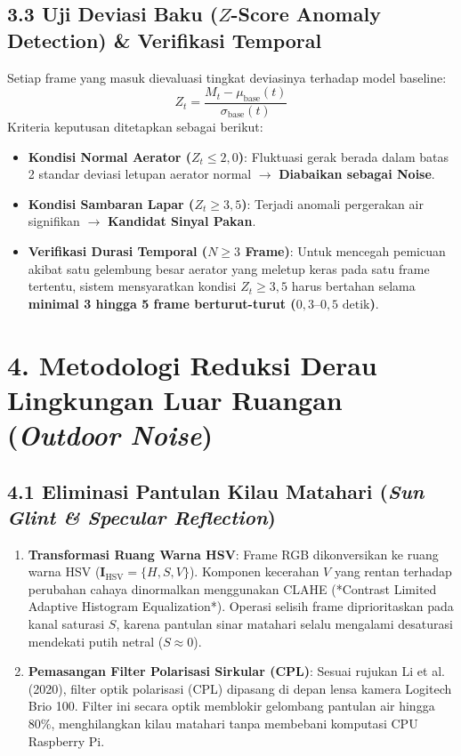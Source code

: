 \documentclass[10pt,a4paper]{article}
\providecommand{\text}[1]{\mbox{#1}}
\begin{document}
\subsection*{3.3 Uji Deviasi Baku ($Z$-Score Anomaly Detection) \& Verifikasi Temporal}
Setiap frame yang masuk dievaluasi tingkat deviasinya terhadap model baseline:
\begin{equation}
Z_t = \frac{M_t - \mu_{\text{base}}(t)}{\sigma_{\text{base}}(t)}
\end{equation}
Kriteria keputusan ditetapkan sebagai berikut:
\begin{itemize}
    \item \textbf{Kondisi Normal Aerator ($Z_t \le 2,0$)}: Fluktuasi gerak berada dalam batas 2 standar deviasi letupan aerator normal $\to$ \textbf{Diabaikan sebagai Noise}.
    \item \textbf{Kondisi Sambaran Lapar ($Z_t \ge 3,5$)}: Terjadi anomali pergerakan air signifikan $\to$ \textbf{Kandidat Sinyal Pakan}.
    \item \textbf{Verifikasi Durasi Temporal ($N \ge 3$ Frame)}: Untuk mencegah pemicuan akibat satu gelembung besar aerator yang meletup keras pada satu frame tertentu, sistem mensyaratkan kondisi $Z_t \ge 3,5$ harus bertahan selama \textbf{minimal 3 hingga 5 frame berturut-turut ($0,3\text{--}0,5\text{ detik}$)}.
\end{itemize}

\newpage

\section*{4. Metodologi Reduksi Derau Lingkungan Luar Ruangan (\textit{Outdoor Noise})}

\subsection*{4.1 Eliminasi Pantulan Kilau Matahari (\textit{Sun Glint \& Specular Reflection})}
\begin{enumerate}
    \item \textbf{Transformasi Ruang Warna HSV}: Frame RGB dikonversikan ke ruang warna HSV ($\mathbf{I}_{\text{HSV}} = \{H, S, V\}$). Komponen kecerahan $V$ yang rentan terhadap perubahan cahaya dinormalkan menggunakan CLAHE (*Contrast Limited Adaptive Histogram Equalization*). Operasi selisih frame diprioritaskan pada kanal saturasi $S$, karena pantulan sinar matahari selalu mengalami desaturasi mendekati putih netral ($S \approx 0$).
    \item \textbf{Pemasangan Filter Polarisasi Sirkular (CPL)}: Sesuai rujukan Li et al. (2020), filter optik polarisasi (CPL) dipasang di depan lensa kamera Logitech Brio 100. Filter ini secara optik memblokir gelombang pantulan air hingga $80\%$, menghilangkan kilau matahari tanpa membebani komputasi CPU Raspberry Pi.
\end{enumerate}
\end{document}
